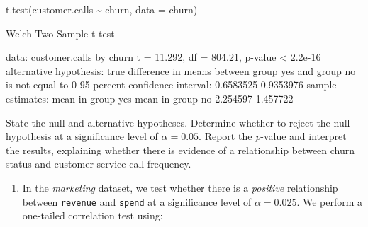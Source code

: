 \documentclass[
  11pt,
]{book}
\makeatletter
\newenvironment{Shaded}{}{}
\newcommand{\AttributeTok}[1]{#1}
\newcommand{\ControlFlowTok}[1]{\textcolor[rgb]{0.07,0.07,0.07}{#1}}
\newcommand{\DecValTok}[1]{#1}
\newcommand{\FloatTok}[1]{#1}
\newcommand{\FunctionTok}[1]{#1}
\newcommand{\NormalTok}[1]{#1}
\newcommand{\OtherTok}[1]{\textcolor[rgb]{0.39,0.39,0.39}{#1}}
\newcommand{\SpecialCharTok}[1]{\textcolor[rgb]{0.39,0.39,0.39}{#1}}
\newcommand{\StringTok}[1]{\textcolor[rgb]{0.39,0.39,0.39}{#1}}
\providecommand{\tightlist}{%
  \setlength{\itemsep}{0pt}\setlength{\parskip}{0pt}}
\newenvironment{kframe}{%
\medskip{}
\setlength{\fboxsep}{.8em}
 \def\at@end@of@kframe{}%
 \ifinner\ifhmode%
  \def\at@end@of@kframe{\end{minipage}}%
  \begin{minipage}{\columnwidth}%
 \fi\fi%
 \def\FrameCommand##1{\hskip\@totalleftmargin \hskip-\fboxsep
 \colorbox{shadecolor}{##1}\hskip-\fboxsep
     \hskip-\linewidth \hskip-\@totalleftmargin \hskip\columnwidth}%
 \MakeFramed {\advance\hsize-\width
   \@totalleftmargin\z@ \linewidth\hsize
   \@setminipage}}%
 {\par\unskip\endMakeFramed%
 \at@end@of@kframe}
\renewenvironment{Shaded}{\begin{kframe}}{\end{kframe}}
\theoremstyle{definition}
\theoremstyle{definition}
\theoremstyle{definition}
\theoremstyle{definition}
\theoremstyle{remark}
\makeatother
\begin{document}
\begin{Shaded}
\begin{Highlighting}[]
\FunctionTok{t.test}\NormalTok{(customer.calls }\SpecialCharTok{\textasciitilde{}}\NormalTok{ churn, }\AttributeTok{data =}\NormalTok{ churn)}
   
\NormalTok{    Welch Two Sample t}\SpecialCharTok{{-}}\NormalTok{test}
   
\NormalTok{   data}\SpecialCharTok{:}\NormalTok{  customer.calls by churn}
\NormalTok{   t }\OtherTok{=} \FloatTok{11.292}\NormalTok{, df }\OtherTok{=} \FloatTok{804.21}\NormalTok{, p}\SpecialCharTok{{-}}\NormalTok{value }\SpecialCharTok{\textless{}} \FloatTok{2.2e{-}16}
\NormalTok{   alternative hypothesis}\SpecialCharTok{:}\NormalTok{ true difference }\ControlFlowTok{in}\NormalTok{ means between group yes and group no is not equal to }\DecValTok{0}
   \DecValTok{95}\NormalTok{ percent confidence interval}\SpecialCharTok{:}
    \FloatTok{0.6583525} \FloatTok{0.9353976}
\NormalTok{   sample estimates}\SpecialCharTok{:}
\NormalTok{   mean }\ControlFlowTok{in}\NormalTok{ group yes  mean }\ControlFlowTok{in}\NormalTok{ group no }
            \FloatTok{2.254597}          \FloatTok{1.457722}
\end{Highlighting}
\end{Shaded}

State the null and alternative hypotheses. Determine whether to reject the null hypothesis at a significance level of \(\alpha=0.05\). Report the \emph{p}-value and interpret the results, explaining whether there is evidence of a relationship between churn status and customer service call frequency.

\begin{enumerate}
\def\labelenumi{\arabic{enumi}.}
\setcounter{enumi}{14}
\tightlist
\item
  In the \emph{marketing} dataset, we test whether there is a \emph{positive} relationship between \texttt{revenue} and \texttt{spend} at a significance level of \(\alpha = 0.025\). We perform a one-tailed correlation test using:
\end{enumerate}

\begin{Shaded}
\end{Shaded}
\end{document}
